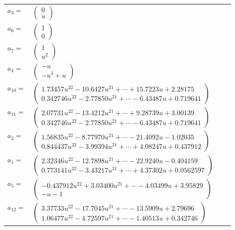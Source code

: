 \documentclass[1p]{elsarticle_modified}
\theoremstyle{definition}
\begin{document}
\begin{tabular}{m{7pt} m{180pt} m{7pt} m{180pt} }
\flushright $a_{3}=$&$\begin{pmatrix}0\\u\end{pmatrix}$ \\
\flushright $a_{6}=$&$\begin{pmatrix}1\\0\end{pmatrix}$ \\
\flushright $a_{7}=$&$\begin{pmatrix}1\\u^2\end{pmatrix}$ \\
\flushright $a_{4}=$&$\begin{pmatrix}- u\\- u^3+u\end{pmatrix}$ \\
\flushright $a_{10}=$&$\begin{pmatrix}1.73457 u^{22}-10.6427 u^{21}+\cdots+15.7223 u+2.28175\\0.342746 u^{22}-2.77850 u^{21}+\cdots-6.43487 u+0.719641\end{pmatrix}$ \\
\flushright $a_{11}=$&$\begin{pmatrix}2.07731 u^{22}-13.4212 u^{21}+\cdots+9.28739 u+3.00139\\0.342746 u^{22}-2.77850 u^{21}+\cdots-6.43487 u+0.719641\end{pmatrix}$ \\
\flushright $a_{2}=$&$\begin{pmatrix}1.56835 u^{22}-8.77970 u^{21}+\cdots-21.4092 u-1.02035\\0.844437 u^{22}-3.99394 u^{21}+\cdots+4.08247 u+0.437912\end{pmatrix}$ \\
\flushright $a_{1}=$&$\begin{pmatrix}2.32346 u^{22}-12.7898 u^{21}+\cdots-22.9240 u-0.404159\\0.773141 u^{22}-3.43217 u^{21}+\cdots+4.37302 u+0.0562597\end{pmatrix}$ \\
\flushright $a_{5}=$&$\begin{pmatrix}-0.437912 u^{22}+3.03400 u^{21}+\cdots-4.03499 u+3.95829\\- u-1\end{pmatrix}$ \\
\flushright $a_{12}=$&$\begin{pmatrix}3.37733 u^{22}-17.7045 u^{21}+\cdots-13.5909 u+2.79696\\1.06477 u^{22}-4.72597 u^{21}+\cdots-1.40513 u+0.342746\end{pmatrix}$ \\

\end{tabular}
\end{document}
